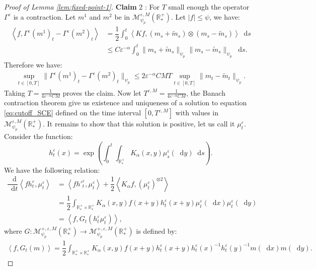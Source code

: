 \documentclass[11pt,a4paper]{article}
\newcommand{\RRP}{\mathbb{R}^+_*}
\newcommand{\MC}{\mathcal{M}}
\newcommand{\brac}[1]{\left\langle#1\right\rangle}
\newcommand{\dd}{\mathop{}\!\mathrm{d}}
\begin{document}
\begin{proof}[Proof of Lemma \ref{lem:fixed-point-1}]
    \textbf{Claim} 2 : For $T$ small enough the operator $\Gamma^\varepsilon$ is a contraction. Let $m^1$ and $m^2$ be in $\MC^{\varepsilon,M}_{\psi_p}\left(\RRP\right)$. Let $|f| \leq \psi$, we have:
    \begin{align*}
        \brac{f,\Gamma^\varepsilon(m^1)_t - \Gamma^\varepsilon(m^2)_t}
        &= \dfrac{1}{2}\int_0^t \brac{Kf,\left(m_s + \tilde{m}_s\right)\otimes\left( m_s - \tilde{m}_s\right)} \dd s \\
        &\leq C\varepsilon^{-\alpha}\int_0^t \|m_s + \tilde{m}_s\|_{\psi_p} \|m_s - \tilde{m}_s\|_{\psi_p}\dd s .
    \end{align*}
    Therefore we have:
    \begin{align*}
        \sup\limits_{t \in [0,T]} \|\Gamma^\varepsilon(m^1)_t - \Gamma^\varepsilon(m^2)_t\|_{\psi_p} \leq 2\varepsilon^{-\alpha} CMT\sup\limits_{t \in [0,T]} \|m_t - \tilde{m}_t\|_{\psi_p} .
    \end{align*}
    Taking $T = \frac{1}{4\varepsilon^{-\alpha}CM}$ proves the claim. Now let $T^{\varepsilon,M} = \frac{1}{4\varepsilon^{-\alpha}CM}$, the Banach contraction theorem give us existence and uniqueness of a solution to equation \eqref{eq:cutoff_SCE} defined on the time interval $[0,T^{\varepsilon,M}]$ with values in $\MC^{\varepsilon,M}_{\psi_p}\left(\RRP\right)$. It remains to show that this solution is positive, let us call it $\mu_t^\varepsilon$. Consider the function:
    \[
    h^\varepsilon_t(x) = \exp\left(\int_0^t\int_{\RRP}K_\alpha (x,y) \mu^\varepsilon_s(\dd y) \dd s\right).
    \]
    We have the following relation:
    \begin{align*}
        \dfrac{\dd}{\dd t}\brac{fh^\varepsilon_t,\mu^\varepsilon_t} &= \brac{fh'^{\varepsilon}_t,\mu^\varepsilon_t} + \dfrac{1}{2}\brac{K_\alpha f,\left(\mu^\varepsilon_t\right)^{\otimes 2}}\\
        &= \dfrac{1}{2}\int_{\RRP\times\RRP} K_\alpha(x,y) f(x+y)h^\varepsilon_t(x+y)\mu^\varepsilon_t(\dd x)\mu^\varepsilon_t(\dd y) \\
        &= \brac{f,G_t(h^\varepsilon_t\mu^\varepsilon_t)},
    \end{align*}
    where $G : \MC^{+,\varepsilon,M}_{\psi_p}(\RRP) \to \MC^{+,\varepsilon,M}_{\psi_p}(\RRP)$ is defined by:
    \begin{align*}
        \brac{f,G_t(m)} =  \dfrac{1}{2}\int_{\RRP\times\RRP} K_\alpha(x,y) f(x+y)h^\varepsilon_t(x+y) h^\varepsilon_t(x)^{-1} h^\varepsilon_t(y)^{-1}m(\dd x)m(\dd y).
    \end{align*}

\end{proof}
\end{document}
